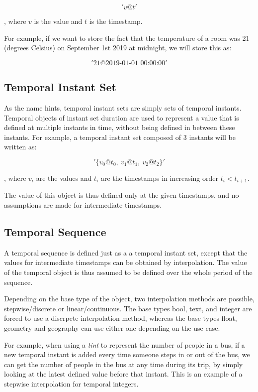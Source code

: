 \[
    'v@t'
\]

, where \(v\) is the value and \(t\) is the timestamp.

For example, if we want to store the fact that the temperature of a room was 21 (degrees Celsius) on September 1st 2019 at midnight, we will store this as:

\[
    '21@\text{2019-01-01 00:00:00}'
\]

\subsection{Temporal Instant Set}

As the name hints, temporal instant sets are simply sets of temporal instants. Temporal objects of instant set duration are used to represent a value that is defined at multiple instants in time, without being defined in between these instants. For example, a temporal instant set composed of 3 instants will be written as:

\[
    '\{v_0@t_0,\ v_1@t_1,\ v_2@t_2\}'
\]

, where \(v_i\) are the values and \(t_i\) are the timestamps in increasing order \(t_i < t_{i+1}\).

The value of this object is thus defined only at the given timestamps, and no assumptions are made for intermediate timestamps.

\subsection{Temporal Sequence}

A temporal sequence is defined just as a a temporal instant set, except that the values for intermediate timestamps can be obtained by interpolation. The value of the temporal object is thus assumed to be defined over the whole period of the sequence.

Depending on the base type of the object, two interpolation methods are possible, stepwise/discrete or linear/continuous. The base types bool, text, and integer are forced to use a discrpete interpolation method, whereas the base types float, geometry and geography can use either one depending on the use case.

For example, when using a \textit{tint} to represent the number of people in a bus, if a new temporal instant is added every time someone steps in or out of the bus, we can get the number of people in the bus at any time during its trip, by simply looking at the latest defined value before that instant. This is an example of a stepwise interpolation for temporal integers.

